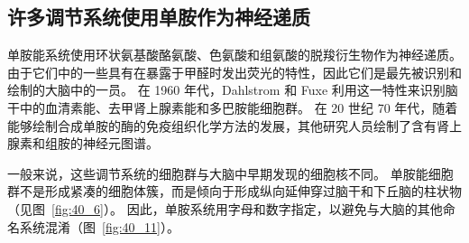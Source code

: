 \subsection{许多调节系统使用单胺作为神经递质}

单胺能系统使用环状氨基酸酪氨酸、色氨酸和组氨酸的脱羧衍生物作为神经递质。
由于它们中的一些具有在暴露于甲醛时发出荧光的特性，因此它们是最先被识别和绘制的大脑中的一员。
在 1960 年代，Dahlstrom 和 Fuxe 利用这一特性来识别脑干中的血清素能、去甲肾上腺素能和多巴胺能细胞群。
在 20 世纪 70 年代，随着能够绘制合成单胺的酶的免疫组织化学方法的发展，其他研究人员绘制了含有肾上腺素和组胺的神经元图谱。


一般来说，这些调节系统的细胞群与大脑中早期发现的细胞核不同。
单胺能细胞群不是形成紧凑的细胞体簇，而是倾向于形成纵向延伸穿过脑干和下丘脑的柱状物（见图~\ref{fig:40_6}）。
因此，单胺系统用字母和数字指定，以避免与大脑的其他命名系统混淆（图~\ref{fig:40_11}）。


